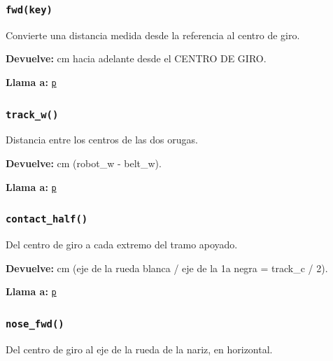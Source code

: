 \subsubsection{\texttt{fwd(key)}}\label{fn:geometry:fwd}
\noindent Convierte una distancia medida desde la referencia al centro de giro.

\par{}\par\smallskip
\noindent\textbf{Devuelve:} cm hacia adelante desde el CENTRO DE GIRO.\par
\noindent\textbf{Llama a:} \hyperref[fn:geometry:p]{\texttt{p}}\par

\subsubsection{\texttt{track\_\allowbreak{}w()}}\label{fn:geometry:track-w}
\noindent Distancia entre los centros de las dos orugas.

\noindent\textbf{Devuelve:} cm (robot\_w - belt\_w).\par
\noindent\textbf{Llama a:} \hyperref[fn:geometry:p]{\texttt{p}}\par

\subsubsection{\texttt{contact\_\allowbreak{}half()}}\label{fn:geometry:contact-half}
\noindent Del centro de giro a cada extremo del tramo apoyado.

\noindent\textbf{Devuelve:} cm (eje de la rueda blanca / eje de la 1a negra = track\_c / 2).\par
\noindent\textbf{Llama a:} \hyperref[fn:geometry:p]{\texttt{p}}\par

\subsubsection{\texttt{nose\_\allowbreak{}fwd()}}\label{fn:geometry:nose-fwd}
\noindent Del centro de giro al eje de la rueda de la nariz, en horizontal.

